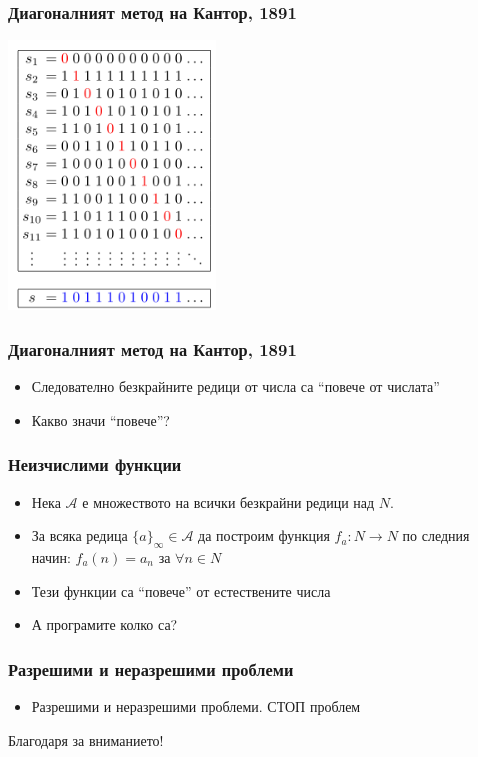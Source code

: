 \documentclass{beamer}
\begin{document}
\begin{frame}[fragile]
\frametitle{Диагоналният метод на Кантор, 1891}


\includegraphics[width=5.5cm]{images/diagonal_argument}


\end{frame}


\begin{frame}[fragile]
\frametitle{Диагоналният метод на Кантор, 1891}


\begin{itemize}
  \item Следователно безкрайните редици от числа са ``повече от числата''
  \item Какво значи ``повече''?
\end{itemize}


\end{frame}

\begin{frame}[fragile]
\frametitle{Неизчислими функции}


\begin{itemize}
  \item Нека $\mathcal{A}$ е множеството на всички безкрайни редици над $N$.
  \item За всяка редица $\{a\}_\infty \in \mathcal{A}$ да построим функция $f_a : N \rightarrow N$ по следния начин: $f_a(n)=a_n$ за $\forall n \in N$
  \item Тези функции са ``повече'' от естествените числа
  \item А програмите колко са?
\end{itemize}


\end{frame}

\begin{frame}[fragile]
\frametitle{Разрешими и неразрешими проблеми}


\begin{itemize}
    \item Разрешими и неразрешими проблеми. СТОП проблем
\end{itemize}


\end{frame}


\begin{frame}
\centerline{Благодаря за вниманието!}
\end{frame}
\end{document}
